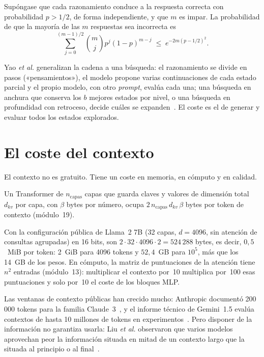 \begin{proposicion}\label{prop:voto}
Supóngase que cada razonamiento conduce a la respuesta correcta con probabilidad $p>1/2$, de forma independiente, y que $m$ es impar. La probabilidad de que la mayoría de las $m$ respuestas sea incorrecta es
\[
\sum_{j=0}^{(m-1)/2}\binom{m}{j}p^{j}(1-p)^{m-j}\;\le\;e^{-2m(p-1/2)^{2}}.
\]
\end{proposicion}

\addtocounter{definicion}{1}%

\begin{observacion}
Yao \emph{et al.} generalizan la cadena a una búsqueda: el razonamiento se divide en pasos («pensamientos»), el modelo propone varias continuaciones de cada estado parcial y el propio modelo, con otro \emph{prompt}, evalúa cada una; una búsqueda en anchura que conserva los $b$ mejores estados por nivel, o una búsqueda en profundidad con retroceso, decide cuáles se expanden~\cite{yao-tot}. El coste es el de generar y evaluar todos los estados explorados.
\end{observacion}

\section{El coste del contexto}

El contexto no es gratuito. Tiene un coste en memoria, en cómputo y en calidad.

\begin{proposicion}\label{prop:kv}
Un Transformer de $n_{\mathrm{capas}}$ capas que guarda claves y valores de dimensión total $d_{kv}$ por capa, con $\beta$ bytes por número, ocupa $2\,n_{\mathrm{capas}}\,d_{kv}\,\beta$ bytes por token de contexto (módulo~19).
\end{proposicion}

Con la configuración pública de Llama~2 7B (32 capas, $d=4096$, sin atención de consultas agrupadas) en 16 bits, son $2\cdot 32\cdot 4096\cdot 2=524\,288$ bytes, es decir, $0{,}5$~MiB por token: 2~GiB para 4096 tokens y $52{,}4$~GB para $10^{5}$, más que los 14~GB de los pesos. En cómputo, la matriz de puntuaciones de la atención tiene $n^{2}$ entradas (módulo~13): multiplicar el contexto por~10 multiplica por~100 esas puntuaciones y solo por~10 el coste de los bloques MLP.

\begin{observacion}\label{obs:lost}
Las ventanas de contexto públicas han crecido mucho: Anthropic documentó 200\,000 tokens para la familia Claude~3~\cite{claude3}, y el informe técnico de Gemini~1.5 evalúa contextos de hasta 10 millones de tokens en experimentos~\cite{gemini15}. Pero disponer de la información no garantiza usarla: Liu \emph{et al.} observaron que varios modelos aprovechan peor la información situada en mitad de un contexto largo que la situada al principio o al final~\cite{liu-lost}.
\end{observacion}

